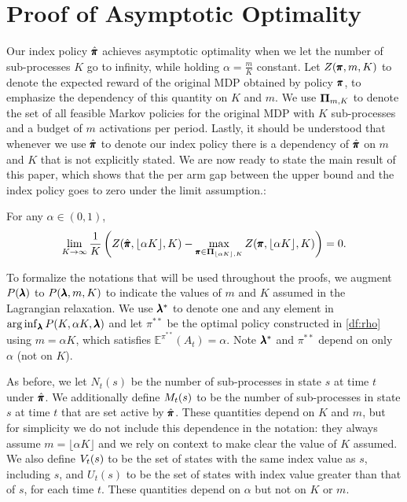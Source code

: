 \section{Proof of Asymptotic Optimality}\label{sec:pf}
Our index policy $\hat{\pmb{\pi}}$ achieves asymptotic optimality when we let the number of sub-processes $K$ go to infinity, while holding $\alpha = \frac{m}{K}$ constant.
Let $Z(\pmb{\pi},m,K)$ to denote the expected reward of the original MDP obtained by policy $\pmb{\pi}$, to emphasize the dependency of this quantity on $K$ and $m$.
We use $\mathbf{\Pi}_{m,K}$ to denote the set of all feasible Markov policies for the original MDP with $K$ sub-processes and a budget of $m$ activations per period. Lastly, it should be understood that whenever we use $\hat{\pmb{\pi}}$ to denote our index policy there is a dependency of $\hat{\pmb{\pi}}$ on $m$ and $K$ that is not explicitly stated. 
We are now ready to state the main result of this paper, which shows that the per arm gap between the upper bound and the index policy goes to zero under the limit assumption.:
\begin{theorem}\label{th:asp}
For any $\alpha\in(0,1)$, 
\begin{equation}
\lim_{K\rightarrow\infty}\frac{1}{K}\left(Z(\hat{\pmb{\pi}},\lfloor \alpha K\rfloor,K) - \max_{\pmb{\pi}\in\mathbf{\Pi}_{\lfloor \alpha K\rfloor,K}}Z(\pmb{\pi},\lfloor \alpha K\rfloor,K)\right) = 0.
\end{equation}
\end{theorem}

To formalize the notations that will be used throughout the proofs, we augment $P(\pmb{\lambda})$ to $P(\pmb{\lambda},m,K)$ to indicate the values of $m$ and $K$ assumed in the Lagrangian relaxation. We use $\pmb{\lambda}^*$ to denote one and any element in $\arg\inf_{\pmb{\lambda}}P(K,\alpha K,\pmb{\lambda})$ and let $\pi^{**}$ be the optimal policy constructed in \eqref{df:rho} using $m=\alpha K$, which satisfies $\mathbb{E}^{\pi^{**}}(A_t)=\alpha$. Note $\pmb{\lambda}^*$ and $\pi^{**}$ depend on only $\alpha$ (not on $K$).


As before, we let $N_t(s)$ be the number of sub-processes in state $s$ at time $t$ under $\hat{\pmb{\pi}}$.  
We additionally define $M_t(s)$ to be the number of sub-processes in state $s$ at time $t$ that are set active by $\hat{\pmb{\pi}}$. These quantities depend on $K$ and $m$, but for simplicity we do not include this dependence in the notation: they always assume $m=\lfloor \alpha K \rfloor$ and we rely on context to make clear the value of $K$ assumed.
We also define $V_t(s)$ to be the set of states with the same index value as $s$, including $s$, and $U_t(s)$ to be the set of states with index value greater than that of $s$, for each time $t$.  These quantities depend on $\alpha$ but not on $K$ or $m$.


